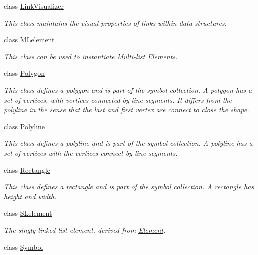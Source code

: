 \begin{DoxyCompactItemize}
class \mbox{\hyperlink{classbridges_1_1datastructure_1_1_link_visualizer}{Link\+Visualizer}}
\begin{DoxyCompactList}\small\item\em This class maintains the visual properties of links within data structures. \end{DoxyCompactList}\item 
class \mbox{\hyperlink{classbridges_1_1datastructure_1_1_m_lelement}{M\+Lelement}}
\begin{DoxyCompactList}\small\item\em This class can be used to instantiate Multi-\/list Elements. \end{DoxyCompactList}\item 
class \mbox{\hyperlink{classbridges_1_1datastructure_1_1_polygon}{Polygon}}
\begin{DoxyCompactList}\small\item\em This class defines a polygon and is part of the symbol collection. A polygon has a set of vertices, with vertices connected by line segments. It differs from the polyline in the sense that the last and first vertex are connect to close the shape. \end{DoxyCompactList}\item 
class \mbox{\hyperlink{classbridges_1_1datastructure_1_1_polyline}{Polyline}}
\begin{DoxyCompactList}\small\item\em This class defines a polyline and is part of the symbol collection. A polyline has a set of vertices with the vertices connect by line segments. \end{DoxyCompactList}\item 
class \mbox{\hyperlink{classbridges_1_1datastructure_1_1_rectangle}{Rectangle}}
\begin{DoxyCompactList}\small\item\em This class defines a rectangle and is part of the symbol collection. A rectangle has height and width. \end{DoxyCompactList}\item 
class \mbox{\hyperlink{classbridges_1_1datastructure_1_1_s_lelement}{S\+Lelement}}
\begin{DoxyCompactList}\small\item\em The singly linked list element, derived from \mbox{\hyperlink{classbridges_1_1datastructure_1_1_element}{Element}}. \end{DoxyCompactList}\item 
class \mbox{\hyperlink{classbridges_1_1datastructure_1_1_symbol}{Symbol}}

\end{DoxyCompactItemize}

